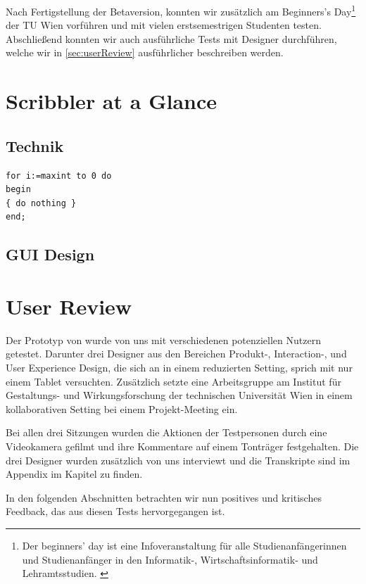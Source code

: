 \medskip Nach Fertigstellung der Betaversion, konnten wir \scribbler zusätzlich am Beginners's Day\footnote{Der beginners' day ist eine Infoveranstaltung für alle Studienanfängerinnen und Studienanfänger in den Informatik-, Wirtschaftsinformatik- und Lehramtsstudien. \citep{TU:2010}} der TU Wien vorführen und mit vielen erstsemestrigen Studenten testen. Abschließend konnten wir auch ausführliche Tests mit Designer durchführen, welche wir in \autoref{sec:userReview} ausführlicher beschreiben werden.

\section{Scribbler at a Glance}

\subsection{Technik} \label{sec:technik}
\begin{lstlisting}[float,caption=A scribbler code snippet]
for i:=maxint to 0 do
begin
{ do nothing }
end;
\end{lstlisting}

\subsection{GUI Design}

\section{User Review} \label{sec:userReview}
Der Prototyp von \scribbler wurde von uns mit verschiedenen potenziellen Nutzern getestet. Darunter drei Designer aus den Bereichen Produkt-, Interaction-, und User Experience Design, die sich an \scribbler in einem reduzierten Setting, sprich mit nur einem Tablet versuchten. Zusätzlich setzte eine Arbeitsgruppe am Institut für Gestaltungs- und Wirkungsforschung der technischen Universität Wien \scribbler in einem kollaborativen Setting bei einem Projekt-Meeting ein. 

Bei allen drei Sitzungen wurden die Aktionen der Testpersonen durch eine Videokamera gefilmt und ihre Kommentare auf einem Tonträger festgehalten. Die drei Designer wurden zusätzlich von uns interviewt und die Transkripte sind im Appendix im Kapitel  zu finden.

In den folgenden Abschnitten betrachten wir nun positives und kritisches Feedback, das aus diesen Tests hervorgegangen ist.

